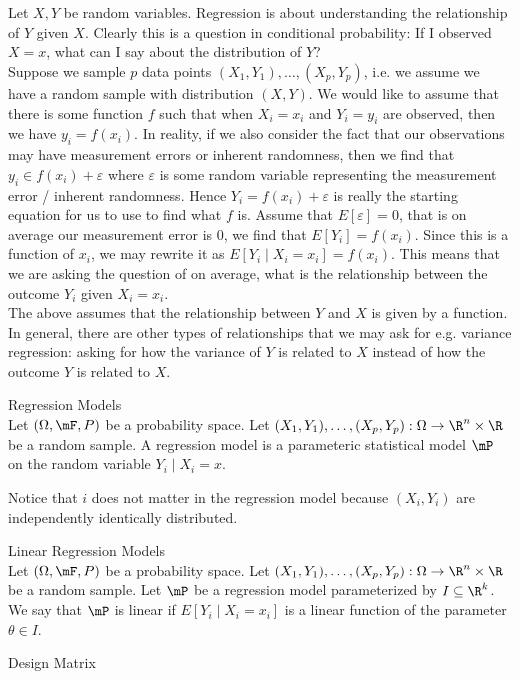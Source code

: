 \documentclass[a4paper]{article}
\begin{document}
\pagebreak
\section{}
\subsection{}
Let $X,Y$ be random variables. Regression is about understanding the relationship of $Y$ given $X$. Clearly this is a question in conditional probability: If I observed $X=x$, what can I say about the distribution of $Y$? \\

Suppose we sample $p$ data points $(X_1,Y_1),\dots,(X_p,Y_p)$, i.e. we assume we have a random sample with distribution $(X,Y)$. We would like to assume that there is some function $f$ such that when $X_i=x_i$ and $Y_i=y_i$ are observed, then we have $y_i=f(x_i)$. In reality, if we also consider the fact that our observations may have measurement errors or inherent randomness, then we find that $y_i\in f(x_i)+\varepsilon$ where $\varepsilon$ is some random variable representing the measurement error / inherent randomness. Hence $Y_i=f(x_i)+\varepsilon$ is really the starting equation for us to use to find what $f$ is. Assume that $E[\varepsilon]=0$, that is on average our measurement error is $0$, we find that $E[Y_i]=f(x_i)$. Since this is a function of $x_i$, we may rewrite it as $E[Y_i\;|\;X_i=x_i]=f(x_i)$. This means that we are asking the question of on average, what is the relationship between the outcome $Y_i$ given $X_i=x_i$. \\

The above assumes that the relationship between $Y$ and $X$ is given by a function. In general, there are other types of relationships that we may ask for e.g. variance regression: asking for how the variance of $Y$ is related to $X$ instead of how the outcome $Y$ is related to $X$. 

\begin{defn}{Regression Models}{}\\
Let $(\Omega,\mF,P)$ be a probability space. Let $(X_1,Y_1),\dots,(X_p,Y_p):\Omega\to\R^n\times\R$ be a random sample. A regression model is a parameteric statistical model $\mP$ on the random variable $Y_i\;|\;X_i=x$. 
\end{defn}

Notice that $i$ does not matter in the regression model because $(X_i,Y_i)$ are independently identically distributed. 

\begin{defn}{Linear Regression Models}{}\\
Let $(\Omega,\mF,P)$ be a probability space. Let $(X_1,Y_1),\dots,(X_p,Y_p):\Omega\to\R^n\times\R$ be a random sample. Let $\mP$ be a regression model parameterized by $I\subseteq\R^k$. We say that $\mP$ is linear if $E[Y_i\;|\;X_i=x_i]$ is a linear function of the parameter $\theta\in I$. 
\end{defn}

\begin{defn}{Design Matrix}{}\\
\end{defn}
\end{document}
